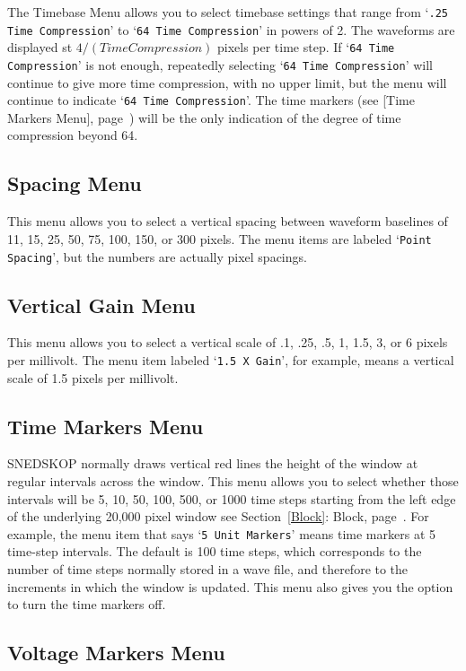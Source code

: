 \documentclass[12pt,openany,oneside]{book}
\newcommand{\tisamp}[1]{`\texttt{#1}'}
\newcommand{\tixref}[1]{see Section~\ref{#1}: #1, page~\pageref{#1}}
\newcommand{\tipxref}[1]{see [#1], page~\pageref{#1}}
\begin{document}
The Timebase Menu allows you to select timebase settings that range from
\tisamp{.25 Time Compression} to \tisamp{64 Time Compression} in powers of
2.  The waveforms are displayed st $4 / (Time Compression)$
pixels per time step.  If \tisamp{64 Time Compression} is not enough,
repeatedly selecting \tisamp{64 Time Compression} will continue to give
more time compression, with no upper limit, but the menu will continue
to indicate \tisamp{64 Time Compression}.  The time markers (\tipxref{Time Markers Menu})
will be the only indication of the degree of time
compression beyond 64.

\subsection{Spacing Menu}

This menu allows you to select a vertical spacing between waveform
baselines of 11, 15, 25, 50, 75, 100, 150, or 300 pixels.  The menu
items are labeled \tisamp{Point Spacing}, but the numbers are actually
pixel spacings.

\subsection{Vertical Gain Menu}

This menu allows you to select a vertical scale of .1, .25, .5, 1,
1.5, 3, or 6 pixels per millivolt.  The menu item labeled \tisamp{1.5 X
Gain}, for example, means a vertical scale of 1.5 pixels per
millivolt.

\subsection{Time Markers Menu}
\label{Time Markers Menu}


SNEDSKOP normally draws vertical red lines the height of the window at
regular intervals across the window.  This menu allows you to select
whether those intervals will be 5, 10, 50, 100, 500, or 1000 time
steps starting from the left edge of the underlying 20,000 pixel
window \tixref{Block}.  For example, the menu item that says \tisamp{5
Unit Markers} means time markers at 5 time-step intervals.  The
default is 100 time steps, which corresponds to the number of time
steps normally stored in a wave file, and therefore to the increments
in which the window is updated.  This menu also gives you the option
to turn the time markers off.

\subsection{Voltage Markers Menu}
\end{document}
